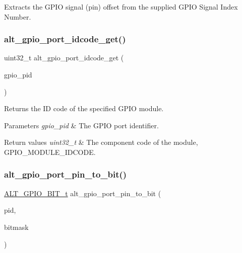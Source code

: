 Extracts the G\+P\+IO signal (pin) offset from the supplied G\+P\+IO Signal Index Number. \mbox{\label{group__ALT__GPIO__UTILITY_gaa3196e9d9d2efee9f473e654f2ca3f8b}} 
\subsubsection{\texorpdfstring{alt\_gpio\_port\_idcode\_get()}{alt\_gpio\_port\_idcode\_get()}}
{\footnotesize\ttfamily uint32\+\_\+t alt\+\_\+gpio\+\_\+port\+\_\+idcode\+\_\+get (\begin{DoxyParamCaption}\item[{\mbox{\hyperlink{group__ALT__GPIO__API__CONFIG_gaaf1cf0e2a720d20cd883810f2b59097e}{A\+L\+T\+\_\+\+G\+P\+I\+O\+\_\+\+P\+O\+R\+T\+\_\+t}}}]{gpio\+\_\+pid }\end{DoxyParamCaption})}

Returns the ID code of the specified G\+P\+IO module.


\begin{DoxyParams}{Parameters}
{\em gpio\+\_\+pid} & The G\+P\+IO port identifier.\\
\hline
\end{DoxyParams}

\begin{DoxyRetVals}{Return values}
{\em uint32\+\_\+t} & The component code of the module, G\+P\+I\+O\+\_\+\+M\+O\+D\+U\+L\+E\+\_\+\+I\+D\+C\+O\+DE. \\
\hline
\end{DoxyRetVals}
\mbox{\label{group__ALT__GPIO__UTILITY_gaceec1bfadaad84d3a382dba9c8a78934}} 
\subsubsection{\texorpdfstring{alt\_gpio\_port\_pin\_to\_bit()}{alt\_gpio\_port\_pin\_to\_bit()}}
{\footnotesize\ttfamily \mbox{\hyperlink{group__ALT__GPIO__BITVIEW_ga6d149a5961bef8b91b8108e3838b1e09}{A\+L\+T\+\_\+\+G\+P\+I\+O\+\_\+B\+I\+T\+\_\+t}} alt\+\_\+gpio\+\_\+port\+\_\+pin\+\_\+to\+\_\+bit (\begin{DoxyParamCaption}\item[{\mbox{\hyperlink{group__ALT__GPIO__API__CONFIG_gaaf1cf0e2a720d20cd883810f2b59097e}{A\+L\+T\+\_\+\+G\+P\+I\+O\+\_\+\+P\+O\+R\+T\+\_\+t}}}]{pid,  }\item[{uint32\+\_\+t}]{bitmask }\end{DoxyParamCaption})}


